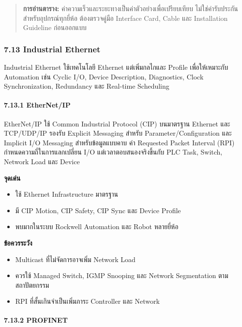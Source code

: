 \begin{quote}
\textbf{การอ่านตาราง:} ค่าความเร็วและระยะทางเป็นค่าตัวอย่างเพื่อเปรียบเทียบ ไม่ใช่ค่ารับประกันสำหรับอุปกรณ์ทุกยี่ห้อ ต้องตรวจคู่มือ Interface Card, Cable และ Installation Guideline ก่อนออกแบบ
\end{quote}



\subsubsection{7.13 Industrial Ethernet}

Industrial Ethernet ใช้เทคโนโลยี Ethernet แต่เพิ่มกลไกและ Profile เพื่อให้เหมาะกับ Automation เช่น Cyclic I/O, Device Description, Diagnostics, Clock Synchronization, Redundancy และ Real-time Scheduling

\paragraph{7.13.1 EtherNet/IP}

EtherNet/IP ใช้ Common Industrial Protocol (CIP) บนมาตรฐาน Ethernet และ TCP/UDP/IP รองรับ Explicit Messaging สำหรับ Parameter/Configuration และ Implicit I/O Messaging สำหรับข้อมูลแบบคาบ ค่า Requested Packet Interval (RPI) กำหนดความถี่ในการแลกเปลี่ยน I/O แต่เวลาตอบสนองจริงขึ้นกับ PLC Task, Switch, Network Load และ Device

\textbf{จุดเด่น}

\begin{itemize}
    \item ใช้ Ethernet Infrastructure มาตรฐาน
    \item มี CIP Motion, CIP Safety, CIP Sync และ Device Profile
    \item พบมากในระบบ Rockwell Automation และ Robot หลายยี่ห้อ
\end{itemize}

\textbf{ข้อควรระวัง}

\begin{itemize}
    \item Multicast ที่ไม่จัดการอาจเพิ่ม Network Load
    \item ควรใช้ Managed Switch, IGMP Snooping และ Network Segmentation ตามสถาปัตยกรรม
    \item RPI ที่สั้นเกินจำเป็นเพิ่มภาระ Controller และ Network
\end{itemize}

\paragraph{7.13.2 PROFINET}

